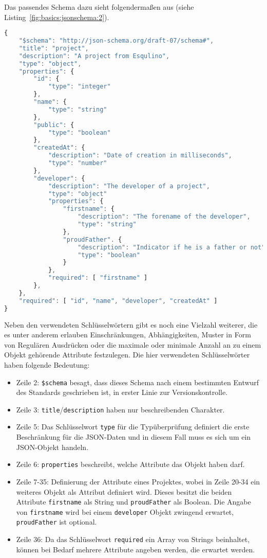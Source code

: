 Das passendes Schema dazu sieht folgendermaßen aus (siehe Listing~\ref{fig:basics:jsonschema:2}).

\begin{lstlisting}[language=Javascript,float=h!,caption={JSON Schema zu Projekt Objekt}, label={fig:basics:jsonschema:2}]
{
    "$schema": "http://json-schema.org/draft-07/schema#",
    "title": "project",
    "description": "A project from Esqulino",
    "type": "object",
    "properties": {
        "id": {
            "type": "integer"
        },
        "name": {
            "type": "string"
        },
        "public": {
            "type": "boolean"
        },
        "createdAt": {
            "description": "Date of creation in milliseconds",
            "type": "number"
        },
        "developer": {
            "description": "The developer of a project",
            "type": "object"
            "properties": {
                "firstname": {
                    "description": "The forename of the developer",
                    "type": "string"
                },
                "proudFather". {
                    "description": "Indicator if he is a father or not",
                    "type": "boolean"
                }
            },
            "required": [ "firstname" ]
        },
    },
    "required": [ "id", "name", "developer", "createdAt" ]
}
\end{lstlisting}

Neben den verwendeten Schlüsselwörtern gibt es noch eine Vielzahl weiterer, die es unter anderem erlauben Einschränkungen, Abhängigkeiten,
Muster in Form von Regulären Ausdrücken oder die maximale oder minimale Anzahl an zu einem Objekt gehörende Attribute festzulegen.
Die hier verwendeten Schlüsselwörter haben folgende Bedeutung:

\begin{itemize}
    \label{basics:jsonschema:items}
    \setlength\itemsep{-1em}
    \item Zeile 2: \texttt{\$schema} besagt, dass dieses Schema nach einem bestimmten Entwurf des Standards geschrieben ist, in erster Linie zur Versionskontrolle.
    \item Zeile 3: \texttt{title}/\texttt{description} haben nur beschreibenden Charakter.
    \item Zeile 5: Das Schlüsselwort \texttt{type} für die Typüberprüfung definiert die erste Beschränkung für die JSON-Daten und in diesem Fall muss es sich um ein JSON-Objekt handeln.
    \item Zeile 6: \texttt{properties} beschreibt, welche Attribute das Objekt haben darf.
    \item Zeile 7-35: Definierung der Attribute eines Projektes, wobei in Zeile 20-34 ein weiteres Objekt als Attribut definiert wird. Dieses besitzt die beiden Attribute \texttt{firstname} als String und \texttt{proudFather} als Boolean. Die Angabe von \texttt{firstname} wird bei einem \texttt{developer} Objekt zwingend erwartet, \texttt{proudFather} ist optional.
    \item Zeile 36: Da das Schlüsselwort \texttt{required}  ein Array von Strings beinhaltet, können bei Bedarf mehrere Attribute angeben werden, die erwartet werden.
\end{itemize}

